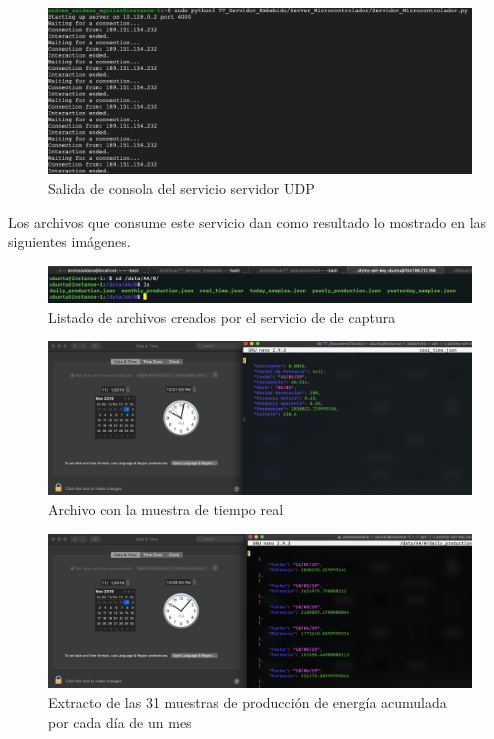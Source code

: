\begin{figure}[H]
	\centering
	\includegraphics[scale=.3]{Capitulo5/images/udp_server_console.png}
	\caption{Salida de consola del servicio servidor UDP}
	\label{fig:consola server udp}
\end{figure} 

Los archivos que consume este servicio dan como resultado lo mostrado en las siguientes imágenes.

\begin{figure}[H]
	\centering
	\includegraphics[scale=.3]{Capitulo5/images/dirlist.png}
	\caption{Listado de archivos creados por el servicio de de captura}
	\label{fig:}
\end{figure} 

\begin{figure}[H]
	\centering
	\includegraphics[scale=.3]{Capitulo5/images/real_time.png}
	\caption{Archivo con la muestra de tiempo real}
	\label{fig:}
\end{figure} 

\begin{figure}[H]
	\centering
	\includegraphics[scale=.3]{Capitulo5/images/daily.png}
	\caption{Extracto de las 31 muestras de producción de energía acumulada por cada día de un mes}
	\label{fig:}
\end{figure}

